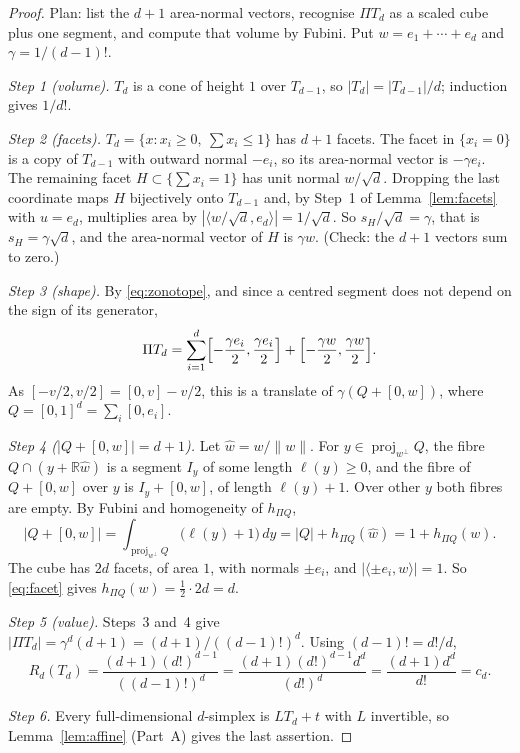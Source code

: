 \documentclass[11pt]{article}
\newcommand{\R}{\mathbb R}
\DeclareMathOperator{\proj}{proj}
\begin{document}
\begin{proof}
Plan: list the \(d+1\) area-normal vectors, recognise \(\Pi T_d\) as a scaled cube plus one segment, and compute that volume by Fubini. Put \(w=e_1+\cdots+e_d\) and \(\gamma=1/(d-1)!\).

\emph{Step 1 (volume).} \(T_d\) is a cone of height \(1\) over \(T_{d-1}\), so \(|T_d|=|T_{d-1}|/d\); induction gives \(1/d!\).

\emph{Step 2 (facets).} \(T_d=\{x:x_i\ge0,\ \sum x_i\le1\}\) has \(d+1\) facets. The facet in \(\{x_i=0\}\) is a copy of \(T_{d-1}\) with outward normal \(-e_i\), so its area-normal vector is \(-\gamma e_i\). The remaining facet \(H\subset\{\sum x_i=1\}\) has unit normal \(w/\sqrt d\). Dropping the last coordinate maps \(H\) bijectively onto \(T_{d-1}\) and, by Step~1 of Lemma~\ref{lem:facets} with \(u=e_d\), multiplies area by \(|\langle w/\sqrt d,e_d\rangle|=1/\sqrt d\). So \(s_H/\sqrt d=\gamma\), that is \(s_H=\gamma\sqrt d\), and the area-normal vector of \(H\) is \(\gamma w\). (Check: the \(d+1\) vectors sum to zero.)

\emph{Step 3 (shape).} By \eqref{eq:zonotope}, and since a centred segment does not depend on the sign of its generator,
\[
 \Pi T_d=\sum_{i=1}^d\Bigl[-\frac{\gamma e_i}2,\frac{\gamma e_i}2\Bigr]+\Bigl[-\frac{\gamma w}2,\frac{\gamma w}2\Bigr].
\]
As \([-v/2,v/2]=[0,v]-v/2\), this is a translate of \(\gamma(Q+[0,w])\), where \(Q=[0,1]^d=\sum_i[0,e_i]\).

\emph{Step 4 (\(|Q+[0,w]|=d+1\)).} Let \(\hat w=w/\|w\|\). For \(y\in\proj_{w^\perp}Q\), the fibre \(Q\cap(y+\R\hat w)\) is a segment \(I_y\) of some length \(\ell(y)\ge0\), and the fibre of \(Q+[0,w]\) over \(y\) is \(I_y+[0,w]\), of length \(\ell(y)+1\). Over other \(y\) both fibres are empty. By Fubini and homogeneity of \(h_{\Pi Q}\),
\[
 |Q+[0,w]|=\int_{\proj_{w^\perp}Q}\bigl(\ell(y)+1\bigr)\,dy
 =|Q|+h_{\Pi Q}(\hat w)=1+h_{\Pi Q}(w).
\]
The cube has \(2d\) facets, of area \(1\), with normals \(\pm e_i\), and \(|\langle\pm e_i,w\rangle|=1\). So \eqref{eq:facet} gives \(h_{\Pi Q}(w)=\tfrac12\cdot2d=d\).

\emph{Step 5 (value).} Steps~3 and~4 give \(|\Pi T_d|=\gamma^d(d+1)=(d+1)/((d-1)!)^d\). Using \((d-1)!=d!/d\),
\[
 R_d(T_d)=\frac{(d+1)(d!)^{d-1}}{((d-1)!)^d}
 =\frac{(d+1)(d!)^{d-1}d^d}{(d!)^d}=\frac{(d+1)d^d}{d!}=c_d.
\]

\emph{Step 6.} Every full-dimensional \(d\)-simplex is \(LT_d+t\) with \(L\) invertible, so Lemma~\ref{lem:affine} (Part~A) gives the last assertion.
\end{proof}
\end{document}

